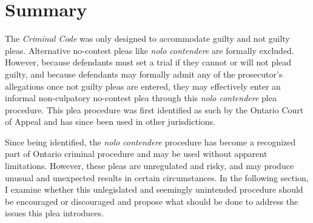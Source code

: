 \section{Summary}

The \textit{Criminal Code} was only designed to accommodate guilty and not guilty pleas. Alternative no-contest pleas like \textit{nolo contendere} are formally excluded. However, because defendants must set a trial if they cannot or will not plead guilty, and because defendants may formally admit any of the prosecutor's allegations once not guilty pleas are entered, they may effectively enter an informal non-culpatory no-contest plea through this \textit{nolo contendere} plea procedure. This plea procedure was first identified as such by the Ontario Court of Appeal and has since been used in other jurisdictions. 

Since being identified, the \textit{nolo contendere} procedure has become a recognized part of Ontario criminal procedure and may be used without apparent limitations. However, these pleas are unregulated and risky, and may produce unusual and unexpected results in certain circumstances. In the following section, I examine whether this unlegislated and seemingly unintended procedure should be encouraged or discouraged and propose what should be done to address the issues this plea introduces.